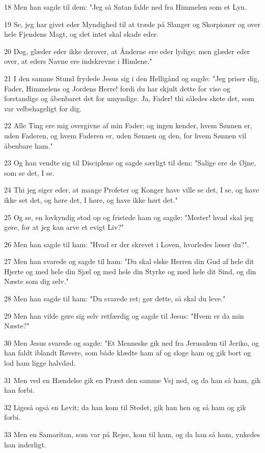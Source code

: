 \par 18 Men han sagde til dem: "Jeg så Satan falde ned fra Himmelen som et Lyn.
\par 19 Se, jeg har givet eder Myndighed til at træde på Slanger og Skorpioner og over hele Fjendens Magt, og slet intet skal skade eder.
\par 20 Dog, glæder eder ikke derover, at Ånderne ere eder lydige; men glæder eder over, at eders Navne ere indskrevne i Himlene."
\par 21 I den samme Stund frydede Jesus sig i den Helligånd og sagde: "Jeg priser dig, Fader, Himmelens og Jordens Herre! fordi du har skjult dette for vise og forstandige og åbenbaret det for umyndige. Ja, Fader! thi således skete det, som var velbehageligt for dig.
\par 22 Alle Ting ere mig overgivne af min Fader; og ingen kender, hvem Sønnen er, uden Faderen, og hvem Faderen er, uden Sønnen og den, for hvem Sønnen vil åbenbare ham."
\par 23 Og han vendte sig til Disciplene og sagde særligt til dem: "Salige ere de Øjne, som se det, I se.
\par 24 Thi jeg siger eder, at mange Profeter og Konger have ville se det, I se, og have ikke set det, og høre det, I høre, og have ikke hørt det."
\par 25 Og se, en lovkyndig stod op og fristede ham og sagde: "Mester! hvad skal jeg gøre, for at jeg kan arve et evigt Liv?"
\par 26 Men han sagde til ham: "Hvad er der skrevet i Loven, hvorledes læser du?".
\par 27 Men han svarede og sagde til ham: "Du skal elske Herren din Gud af hele dit Hjerte og med hele din Sjæl og med hele din Styrke og med hele dit Sind, og din Næste som dig selv."
\par 28 Men han sagde til ham: "Du svarede ret; gør dette, så skal du leve."
\par 29 Men han vilde gøre sig selv retfærdig og sagde til Jesus: "Hvem er da min Næste?"
\par 30 Men Jesus svarede og sagde: "Et Menneske gik ned fra Jerusalem til Jeriko, og han faldt iblandt Røvere, som både klædte ham af og sloge ham og gik bort og lod ham ligge halvdød.
\par 31 Men ved en Hændelse gik en Præst den samme Vej ned, og da han så ham, gik han forbi.
\par 32 Ligeså også en Levit; da han kom til Stedet, gik han hen og så ham og gik forbi.
\par 33 Men en Samaritan, som var på Rejse, kom til ham, og da han så ham, ynkedes han inderligt.
